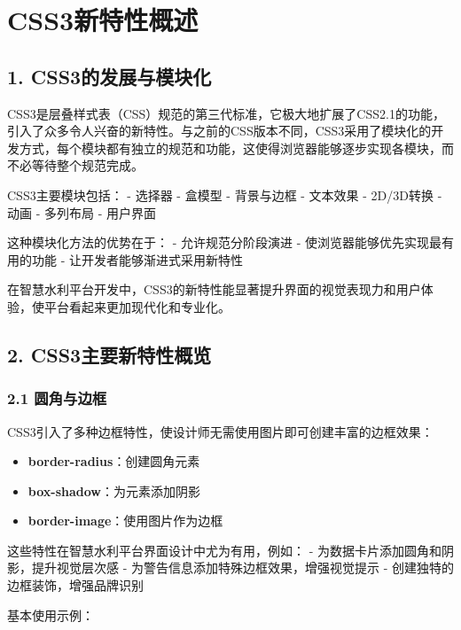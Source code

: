 \section{CSS3新特性概述}\label{css3ux65b0ux7279ux6027ux6982ux8ff0}

\subsection{1.
CSS3的发展与模块化}\label{css3ux7684ux53d1ux5c55ux4e0eux6a21ux5757ux5316}

CSS3是层叠样式表（CSS）规范的第三代标准，它极大地扩展了CSS2.1的功能，引入了众多令人兴奋的新特性。与之前的CSS版本不同，CSS3采用了模块化的开发方式，每个模块都有独立的规范和功能，这使得浏览器能够逐步实现各模块，而不必等待整个规范完成。

CSS3主要模块包括： - 选择器 - 盒模型 - 背景与边框 - 文本效果 - 2D/3D转换
- 动画 - 多列布局 - 用户界面

这种模块化方法的优势在于： - 允许规范分阶段演进 -
使浏览器能够优先实现最有用的功能 - 让开发者能够渐进式采用新特性

在智慧水利平台开发中，CSS3的新特性能显著提升界面的视觉表现力和用户体验，使平台看起来更加现代化和专业化。

\subsection{2.
CSS3主要新特性概览}\label{css3ux4e3bux8981ux65b0ux7279ux6027ux6982ux89c8}

\subsubsection{2.1 圆角与边框}\label{ux5706ux89d2ux4e0eux8fb9ux6846}

CSS3引入了多种边框特性，使设计师无需使用图片即可创建丰富的边框效果：

\begin{itemize}
\tightlist
\item
  \textbf{border-radius}：创建圆角元素
\item
  \textbf{box-shadow}：为元素添加阴影
\item
  \textbf{border-image}：使用图片作为边框
\end{itemize}

这些特性在智慧水利平台界面设计中尤为有用，例如： -
为数据卡片添加圆角和阴影，提升视觉层次感 -
为警告信息添加特殊边框效果，增强视觉提示 -
创建独特的边框装饰，增强品牌识别

基本使用示例：

